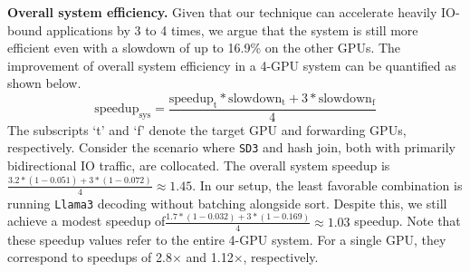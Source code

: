 \noindent
\textbf{Overall system efficiency.}
Given that our technique can accelerate heavily IO-bound applications by 3 to 4 times, we argue that the system is still more efficient even with a slowdown of up to 16.9\% on the other GPUs.
The improvement of overall system efficiency in a 4-GPU system can be quantified as shown below.
$$
\text{speedup}_\text{sys} = \frac{\text{speedup}_\text{t} * \text{slowdown}_\text{t} + 3 * \text{slowdown}_\text{f}}{4}
$$
The subscripts `t' and `f' denote the target GPU and forwarding GPUs, respectively. 
Consider the scenario where \texttt{SD3} and hash join, both with primarily bidirectional IO traffic, are collocated.
The overall system speedup is $\frac{3.2 * (1 - 0.051) + 3 * (1 - 0.072)}{4} \approx 1.45$.
In our setup, the least favorable combination is running \texttt{Llama3} decoding without batching alongside sort. 
Despite this, we still achieve a modest speedup of$\frac{1.7 * (1 - 0.032) + 3 * (1 - 0.169)}{4} \approx 1.03$ speedup.
Note that these speedup values refer to the entire 4-GPU system. 
For a single GPU, they correspond to speedups of 2.8$\times$ and 1.12$\times$, respectively.

\begin{comment}
where the subscript ``t'' and ``f'' mean the target GPU and the forwarding GPUs.
Consider the case of collocating \texttt{SD3} and hash join, whose IO traffic is mainly bidirectional.
The whose system speedup is $\frac{3.2 * (1 - 0.051) + 3 * (1 - 0.072)}{4} \approx 1.45$.
In our setup, the worst combination is running \texttt{Llama3} decoding without batching with sort, but we still achieve a minor $\frac{1.7 * (1 - 0.032) + 3 * (1 - 0.169)}{4} \approx 1.03$ speedup.
Note that the speedup here is in terms of all 4 GPUs, and the speedup above translates to 2.8$\times$ and 1.12$\times$ in terms of a single GPU.
\end{comment}
